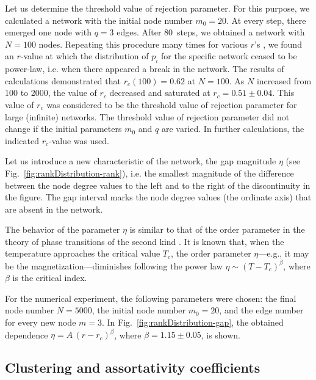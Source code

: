 \documentclass[aps,preprint]{revtex4}%
\begin{document}
Let us determine the threshold value of rejection parameter. For this purpose,
we calculated a network with the initial node number $m_{0}=20$. At every
step, there emerged one node with $q=3$ edges. After 80~steps, we obtained a
network with $N=100$ nodes. Repeating this procedure many times for various
$r$'s , we found an $r$-value at which the distribution of $p_{i}$ for the
specific network ceased to be power-law, i.e. when there appeared a break in
the network. The results of calculations demonstrated that $r_{c}(100)=0.62$
at $N=100$. As $N$ increased from 100 to 2000, the value of $r_{c}$ decreased
and saturated at $r_{c}=0.51\pm0.04$. This value of $r_{c}$ was considered to
be the threshold value of rejection parameter for large (infinite) networks.
The threshold value of rejection parameter did not change if the initial
parameters $m_{0}$ and $q$ are varied. In further calculations, the indicated
$r_{c}$-value was used.

Let us introduce a new characteristic of the network, the gap magnitude $\eta$
(see Fig.~\ref{fig:rankDistribution-rank}), i.e. the smallest magnitude of the
difference between the node degree values to the left and to the right of the
discontinuity in the figure. The gap interval marks the node degree values
(the ordinate axis) that are absent in the network.

The behavior of the parameter $\eta$ is similar to that of the order parameter
in the theory of phase transitions of the second kind \cite{Landau}. It is
known that, when the temperature approaches the critical value $T_{c}$, the
order parameter $\eta$---e.g., it may be the magnetization---diminishes
following the power law $\eta\sim(T-T_{c})^{\beta}$, where $\beta$ is the
critical index.

For the numerical experiment, the following parameters were chosen: the final
node number $N=5000$, the initial node number $m_{0}=20$, and the edge number
for every new node $m=3$. In Fig.~\ref{fig:rankDistribution-gap}, the obtained
dependence $\eta=A\,{(r-r_{c})}^{\beta}$, where $\beta=1.15\pm0.05$, is shown.

\subsection{Clustering and assortativity coefficients}
\end{document}
